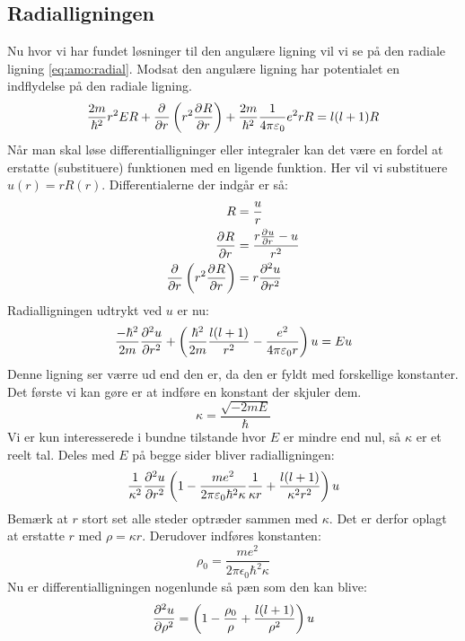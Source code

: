 \documentclass[../../Atom-ogMolekylefysik.tex]{subfiles}
\begin{document}
\subsection{Radialligningen}
Nu hvor vi har fundet løsninger til den angulære ligning vil vi se på den radiale ligning \eqref{eq:amo:radial}. Modsat den angulære ligning har potentialet en indflydelse på den radiale ligning.
\begin{equation}
\frac{2m}{\hbar^2}r^{2}ER+\pdif{r}{}\left(r^2\pdif{r}{R}\right)+\frac{2m}{\hbar^2}\frac{1}{4\pi\epsilon_{0}}e^2rR=l(l+1)R
\end{equation}
Når man skal løse differentialligninger eller integraler kan det være en fordel at erstatte (substituere) funktionen med en ligende funktion. Her vil vi substituere $u(r)=rR(r)$. Differentialerne der indgår er så:
\begin{align*}
    R&=\frac{u}{r}\\
    \pdif{r} R &= \frac{r\pdif{r}u -u}{r^2}\\
    \pdif{r}{}\left(r^2\pdif{r}{R}\right)&=r\pdif[2]{r}{u}
\end{align*}
Radialligningen udtrykt ved $u$ er nu:
\begin{equation}
    \frac{-\hbar^2}{2m}\pdif[2]{r}u+\left(\frac{\hbar^2}{2m}\frac{l(l+1)}{r^2}-\frac{e^2}{4\pi\epsilon_0r}\right)u = Eu
\end{equation}
Denne ligning ser værre ud end den er, da den er fyldt med forskellige konstanter. Det første vi kan gøre er at indføre en konstant der skjuler dem.
\begin{equation}
\kappa=\frac{\sqrt{-2mE}}{\hbar}
\label{eq:amo:kappa}
\end{equation}
Vi er kun interesserede i bundne tilstande hvor $E$ er mindre end nul, så $\kappa$ er et reelt tal. Deles med $E$ på begge sider bliver radialligningen:
\begin{equation}
    \frac{1}{\kappa^2}\pdif[2]{r}u\left(1-\frac{me^2}{2\pi\epsilon_0\hbar^2 \kappa}\frac{1}{\kappa r}+\frac{l(l+1)}{\kappa^2r^2}\right)u
\end{equation}
Bemærk at $r$ stort set alle steder optræder sammen med $\kappa$. Det er derfor oplagt at erstatte $r$ med $\rho=\kappa r$. Derudover indføres konstanten:
\begin{equation}
\rho_0 = \frac{me^2}{2\pi\epsilon_0\hbar^2\kappa}
\label{eq:amo:rhonul}
\end{equation}
Nu er differentialligningen nogenlunde så pæn som den kan blive:
\begin{equation}
    \pdif[2]{\rho}u=\left(1-\frac{\rho_0}{\rho}+\frac{l(l+1)}{\rho^2}\right)u
\end{equation}
\end{document}
